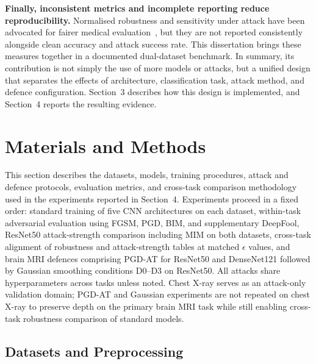 \documentclass[12pt,a4paper,oneside]{report}
\begin{document}
\textbf{Finally, inconsistent metrics and incomplete reporting reduce reproducibility.} Normalised robustness and sensitivity under attack have been advocated for fairer medical evaluation~\cite{ma2021understanding}, but they are not reported consistently alongside clean accuracy and attack success rate. This dissertation brings these measures together in a documented dual-dataset benchmark. In summary, its contribution is not simply the use of more models or attacks, but a unified design that separates the effects of architecture, classification task, attack method, and defence configuration. Section~3 describes how this design is implemented, and Section~4 reports the resulting evidence.

\chapter{Materials and Methods}
\label{ch:methods}


This section describes the datasets, models, training procedures, attack and defence protocols, evaluation metrics, and cross-task comparison methodology used in the experiments reported in Section~4. Experiments proceed in a fixed order: standard training of five CNN architectures on each dataset, within-task adversarial evaluation using FGSM, PGD, BIM, and supplementary DeepFool, ResNet50 attack-strength comparison including MIM on both datasets, cross-task alignment of robustness and attack-strength tables at matched $\epsilon$ values, and brain MRI defences comprising PGD-AT for ResNet50 and DenseNet121 followed by Gaussian smoothing conditions D0--D3 on ResNet50. All attacks share hyperparameters across tasks unless noted. Chest X-ray serves as an attack-only validation domain; PGD-AT and Gaussian experiments are not repeated on chest X-ray to preserve depth on the primary brain MRI task while still enabling cross-task robustness comparison of standard models.

\section{Datasets and Preprocessing}
\label{sec:methods-data}

\end{document}

